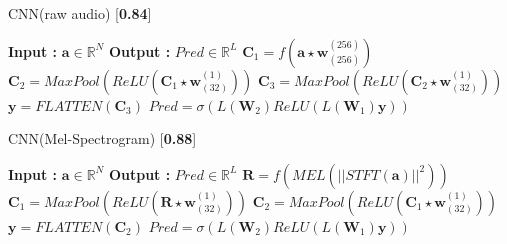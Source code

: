 \begin{minipage}[t]{7.5cm}
  \vspace{0pt}  
  \begin{algorithm}[H]
    \caption{CNN(raw audio) [\textbf{0.84}]}
    \begin{algorithmic}[1]
      \Statex \textbf{Input :} $\textbf{a} \in \mathbb{R}^{N}$
      \Statex \textbf{Output :} $Pred \in \mathbb{R}^{L}$ 
      \State $\textbf{C}_{1}  = f(\textbf{a}\star\textbf{w}_{(256)}^{(256)})$
      \State $\textbf{C}_{2} =  MaxPool(ReLU(\textbf{C}_{1}\star\textbf{w}_{(32)}^{(1)}))$
       \State $\textbf{C}_{3} = MaxPool(ReLU(\textbf{C}_{2}\star\textbf{w}_{(32)}^{(1)}))$
       \State $\textbf{y} = FLATTEN(\textbf{C}_{3})$
       \State $Pred = \sigma(L(\textbf{W}_{2})ReLU(L(\textbf{W}_{1})\textbf{y}))$
   \end{algorithmic}
  \end{algorithm}
\end{minipage}%
\begin{minipage}[t]{7.5cm}
  \vspace{0pt}
  \begin{algorithm}[H]
    \caption{CNN(Mel-Spectrogram) [\textbf{0.88}]}
     \begin{algorithmic}[1]
      \Statex \textbf{Input :} $\textbf{a} \in \mathbb{R}^{N}$
      \Statex \textbf{Output :} $Pred \in \mathbb{R}^{L}$ 
      \State $\textbf{R}  = f(MEL(||STFT(\textbf{a})||^{2}))$
      \State $\textbf{C}_{1} =  MaxPool(ReLU(\textbf{R}\star\textbf{w}_{(32)}^{(1)}))$
       \State $\textbf{C}_{2} = MaxPool(ReLU(\textbf{C}_{1}\star\textbf{w}_{(32)}^{(1)}))$
       \State $\textbf{y} = FLATTEN(\textbf{C}_{2})$
       \State $Pred = \sigma(L(\textbf{W}_{2})ReLU(L(\textbf{W}_{1})\textbf{y}))$
   \end{algorithmic}
  \end{algorithm}
\end{minipage}

